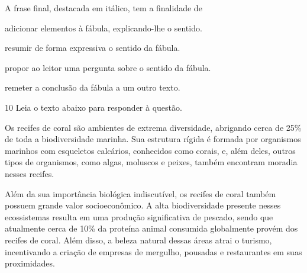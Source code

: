 A frase final, destacada em itálico, tem a finalidade de 

\begin{escolha}
    
    \item adicionar elementos à fábula, explicando-lhe o sentido. 
    
    \item resumir de forma expressiva o sentido da fábula. 
    
    \item propor ao leitor uma pergunta sobre o sentido da fábula.
    
    \item remeter a conclusão da fábula a um outro texto.  

\end{escolha}

\num{10} Leia o texto abaixo para responder à questão. 

\begin{myquote}



Os recifes de coral são ambientes de extrema diversidade, abrigando cerca de
25\% de toda a biodiversidade marinha. Sua estrutura rígida é formada por 
organismos marinhos com esqueletos calcários, conhecidos como corais, e, 
além deles, outros tipos de organismos, como algas, moluscos e peixes, também
encontram moradia nesses recifes.

Além da sua importância biológica indiscutível, os recifes de coral também
possuem grande valor socioeconômico. A alta biodiversidade presente nesses
ecossistemas resulta em uma produção significativa de pescado, sendo que
atualmente cerca de 10\% da proteína animal consumida globalmente provém 
dos recifes de coral. Além disso, a beleza natural dessas áreas atrai o 
turismo, incentivando a criação de empresas de mergulho, pousadas e 
restaurantes em suas proximidades.


\end{myquote}

